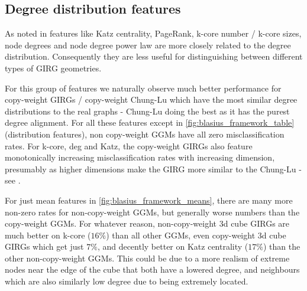 \subsection{Degree distribution features}
As noted in \cite{blasius2018towards} features like Katz centrality, PageRank, k-core number / k-core sizes, node degrees and node degree power law are more closely related to the degree distribution. Consequently they are less useful for distinguishing between different types of GIRG geometries.

For this group of features we naturally observe much better performance for copy-weight GIRGs / copy-weight Chung-Lu which have the most similar degree distributions to the real graphs - Chung-Lu doing the best as it has the purest degree alignment. For all these features  except  in \cref{fig:blasius_framework_table} (distribution features), non copy-weight GGMs have all zero misclassification rates. For k-core, deg and Katz, the copy-weight GIRGs also feature monotonically increasing misclassification rates with increasing dimension, presumably as higher dimensions make the GIRG more similar to the Chung-Lu - see \cite{friedrich2023cliques}.

For just mean features in \cref{fig:blasius_framework_means}, there are many more non-zero rates for non-copy-weight GGMs, but generally worse numbers than the copy-weight GGMs. For whatever reason, non-copy-weight 3d cube GIRGs are much better on k-core ($16\%$) than all other GGMs, even copy-weight 3d cube GIRGs which get just $7\%$, and decently better on Katz centrality ($17\%$) than the other non-copy-weight GGMs.
This could be due to a more realism of extreme nodes near the edge of the cube that both have a lowered degree, and neighbours which are also similarly low degree due to being extremely located.

